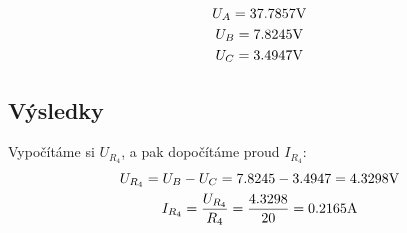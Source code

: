 \begin{gather*}
U_A = 37.7857 \Vo\\
U_B = 7.8245 \Vo\\
U_C = 3.4947 \Vo
\end{gather*}
\noindent
\subsection{Výsledky}
Vypočítáme si $U_{R_4}$, a pak dopočítáme proud $I_{R_4}$:
\begin{gather*}
U_{R_4} = U_B - U_C = 7.8245 - 3.4947 = 4.3298 \Vo \\
I_{R_4} = \frac{U_{R_4}}{R_4} = \frac{4.3298}{20} = 0.2165 \Am
\end{gather*}